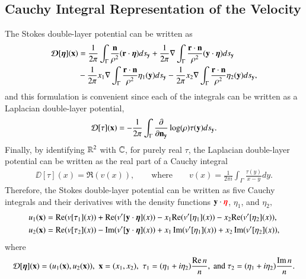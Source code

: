 \documentclass[preprint, 10pt]{elsarticle}
\begin{document}
\subsection{Cauchy Integral Representation of the Velocity}
The Stokes double-layer potential can be written as
\begin{align}
  {\boldsymbol{\mathcal D}}[{\boldsymbol\eta}]({\mathbf{x}}) &= 
    \frac{1}{2\pi} \int_{\Gamma} 
      \frac{{\mathbf{n}}}{\rho^2} ({\mathbf{r}} \cdot {\boldsymbol\eta}) ds_{\mathbf{y}} + 
    \frac{1}{2\pi} \nabla \int_{\Gamma}
      \frac{{\mathbf{r}} \cdot {\mathbf{n}}}{\rho^2} ({\mathbf{y}} \cdot {\boldsymbol\eta})ds_{\mathbf{y}} \\
    &- \frac{1}{2\pi} x_1 \nabla \int_{\Gamma}
      \frac{{\mathbf{r}} \cdot {\mathbf{n}}}{\rho^2}\eta_1({\mathbf{y}}) ds_{\mathbf{y}} -
    \frac{1}{2\pi} x_2 \nabla \int_{\Gamma}
      \frac{{\mathbf{r}} \cdot {\mathbf{n}}}{\rho^2}\eta_2({\mathbf{y}}) ds_{\mathbf{y}},
\end{align}
and this formulation is convenient since each of the integrals can be
written as a Laplacian double-layer potential,
\begin{align}
  {\mathcal{D}}[\tau]({\mathbf{x}}) = -\frac{1}{2\pi} \int_{\Gamma} \frac{\partial }{\partial {\mathbf{n}}_{\mathbf{y}}}
    \log(\rho) \tau({\mathbf{y}}) ds_{\mathbf{y}}.
\end{align}
Finally, by identifying ${\mathbb{R}}^2$ with ${\mathbb{C}}$, for purely real $\tau$, the
Laplacian double-layer potential can be written as the real part of a
Cauchy integral
\begin{align}
  \DD[\tau](x) = \Re (v(x)),
  \qquad \text{where} \qquad
  v(x) = \frac{1}{2\pi i} \int_\Gamma \frac{\tau(y)}{x - y} dy.
\end{align}
Therefore, the Stokes double-layer potential can be written as five
Cauchy integrals and their derivatives with the density functions ${\mathbf{y}}
\cdot {\color{red}{\boldsymbol\eta}}$, $\eta_1$, and $\eta_2,$
{\color{red}
\begin{align}
 u_1({\mathbf{x}})&= {\mathrm{Re}} (v[\tau_1](x)) + {\mathrm{Re}} (v'[{\mathbf{y}}\cdot{\boldsymbol\eta}](x)) 
           -x_1{\mathrm{Re}} (v'[\eta_1](x)) -x_2{\mathrm{Re}} (v'[\eta_2](x)),\\
 u_2({\mathbf{x}})&= {\mathrm{Re}} (v[\tau_2](x)) - \operatorname{Im} (v'[{\mathbf{y}}\cdot{\boldsymbol\eta}](x)) 
       +x_1\operatorname{Im} (v'[\eta_1](x)) 
      +x_2\operatorname{Im} (v'[\eta_2](x)),
\end{align}
where
\begin{align*} 
{\mathcal{D}}[{\boldsymbol\eta}]({\mathbf{x}})=(u_1({\mathbf{x}}),u_2({\mathbf{x}})), \,\, 
{\mathbf{x}}=(x_1,x_2), \,\,
\tau_1=(\eta_1+i\eta_2)\frac{{\mathrm{Re}} \, n}{n}, \text{ and }
\tau_2=(\eta_1+i\eta_2)\frac{\operatorname{Im} n}{n}.
\end{align*}
}
\end{document}
